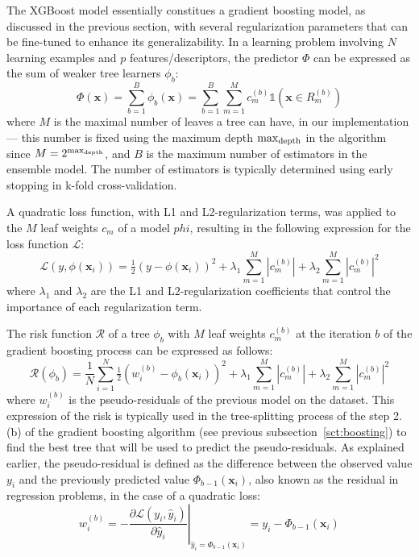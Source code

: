 \documentclass[main]{subfiles}
\begin{document}
The XGBoost model essentially constitues a gradient boosting model, as discussed in the previous section, with several regularization parameters that can be fine-tuned to enhance its generalizability. In a learning problem involving $N$ learning examples and $p$ features/descriptors, the predictor $\Phi$ can be expressed as the sum of weaker tree learners $\phi_b$:
\begin{equation}
  \Phi(\mathbf{x}) = \sum_{b=1}^{B} \phi_b(\mathbf{x}) = \sum_{b=1}^{B} \sum_{m=1}^{M}c_m^{(b)} \mathbb{1}(\mathbf{x}\in R_m^{(b)})
\end{equation}
where $M$ is the maximal number of leaves a tree can have, in our implementation --- this number is fixed using the maximum depth $\max_{\text{depth}}$ in the algorithm since $M=2^{\max_{\text{depth}}}$, and $B$ is the maximum number of estimators in the ensemble model. The number of estimators is typically determined using early stopping in k-fold cross-validation. 

A quadratic loss function, with L1 and L2-regularization terms, was applied to the $M$ leaf weights $c_m$ of a model $phi$, resulting in the following expression for the loss function $\mathcal{L}$: 
\begin{equation}
  \mathcal{L}\left(y,\phi(\mathbf{x}_i)\right) = \tfrac{1}{2}{\left(y - \phi(\mathbf{x}_i)\right)}^2 + \lambda_1 \sum_{m=1}^{M}\left\lvert{c_m^{(b)}}\right\rvert + \lambda_2 \sum_{m=1}^{M}{\left\lvert{c_m^{(b)}}\right\rvert}^2 
\end{equation}
where $\lambda_1$ and $\lambda_2$ are the L1 and L2-regularization coefficients that control the importance of each regularization term. 

The risk function $\mathcal{R}$ of a tree $\phi_b$ with $M$ leaf weights $c_m^{(b)}$ at the iteration $b$ of the gradient boosting process can be expressed as follows:
\begin{equation}
  \mathcal{R}(\phi_b) = \frac{1}{N}\sum_{i=1}^{N} \tfrac{1}{2}{\left(w_i^{(b)} - \phi_b(\mathbf{x}_i)\right)}^2 + \lambda_1 \sum_{m=1}^{M}\left\lvert{c_m^{(b)}}\right\rvert + \lambda_2 \sum_{m=1}^{M}{\left\lvert{c_m^{(b)}}\right\rvert}^2 
\end{equation}
where $w_i^{(b)}$ is the pseudo-residuals of the previous model on the dataset. This expression of the risk is typically used in the tree-splitting process of the step 2.(b) of the gradient boosting algorithm (see previous subsection~\ref{sct:boosting}) to find the best tree that will be used to predict the pseudo-residuals. As explained earlier, the pseudo-residual is defined as the difference between the observed value $y_i$ and the previously predicted value $\Phi_{b-1}(\mathbf{x}_i)$, also known as the residual in regression problems, in the case of a quadratic loss:
\begin{equation}
  w_i^{(b)} = -\left.\frac{\partial\mathcal{L}\left(y_i,\hat{y}_i\right)}{\partial\hat{y}_i}\right|_{\hat{y}_i=\Phi_{b-1}(\mathbf{x}_i)} = y_i - \Phi_{b-1}(\mathbf{x}_i)
\end{equation}
\end{document}

